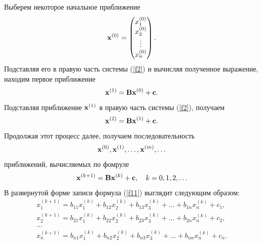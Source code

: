 \documentclass[12pt]{article}
\begin{document}
	Выберем некоторое начальное приближение
	\begin{equation}
		\bold{x}^{\left(0\right)}=
		\begin{pmatrix}
			x_1^{\left(0\right)}\\
			x_2^{\left(0\right)}\\
			\vdots\\
			x_n^{\left(0\right)}
		\end{pmatrix}.
	\end{equation}
	Подставляя его в правую часть системы (\ref{f2}) и вычисляя полученное выражение, находим первое приближение
	\begin{equation}
		\bold{x}^{\left(1\right)}=\bold{B}\bold{x}^{\left(0\right)}+\bold{c}.
	\end{equation}
	Подставляя приближение $\bold{x}^{\left(1\right)}$ в правую часть системы (\ref{f2}), получаем
	\begin{equation}
		\bold{x}^{\left(2\right)}=\bold{B}\bold{x}^{\left(1\right)}+\bold{c}.
	\end{equation}
	Продолжая этот процесс далее, получаем последовательность
	\begin{equation}
		\bold{x}^{\left(0\right)}, \bold{x}^{\left(1\right)},\ldots,\bold{x}^{\left(m\right)},\ldots
	\end{equation}
	приближений, вычисляемых по фомруле
	\begin{equation}
		\bold{x}^{\left(k+1\right)}=\bold{B}\bold{x}^{\left(k\right)}+\bold{c},\quad k=0,1,2,\ldots\label{f11}
	\end{equation}
	В развернутой форме записи формула (\ref{f11}) выглядит следующим образом:
	\begin{equation}
		\begin{gathered}
			x_1^{\left(k+1\right)}=b_{11}x_1^{\left(k\right)}+b_{12}x_2^{\left(k\right)}+b_{13}x_3^{\left(k\right)}+\ldots+b_{1n}x_n^{\left(k\right)}+c_1,\\
			x_2^{\left(k+1\right)}=b_{21}x_1^{\left(k\right)}+b_{22}x_2^{\left(k\right)}+b_{23}x_3^{\left(k\right)}+\ldots+b_{2n}x_n^{\left(k\right)}+c_2,\\
			\ldots\quad\quad\quad\quad\quad\quad\quad\quad\quad\quad\quad\quad\quad\quad\quad\quad\quad\quad\quad\quad\\
			x_n^{\left(k+1\right)}=b_{n1}x_1^{\left(k\right)}+b_{n2}x_2^{\left(k\right)}+b_{n3}x_3^{\left(k\right)}+\ldots+b_{nn}x_n^{\left(k\right)}+c_n.\\
		\end{gathered}
	\end{equation}
	
\end{document}
